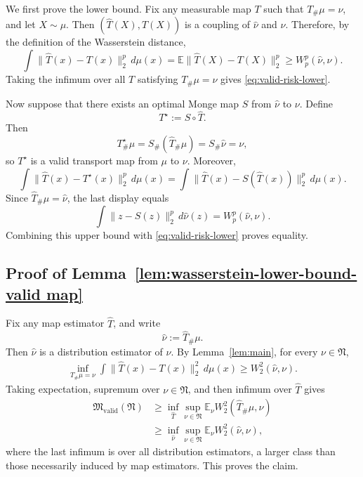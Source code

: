 \documentclass[11pt,twoside]{article}
\newcommand{\targetclass}{\mathfrak{N}}
\newcommand{\validminimaxrisk}{\mathfrak{M}_{\text{valid}}}
\begin{document}
We first prove the lower bound. Fix any measurable map $T$ such that $T_{\#}\mu=\nu$, and let $X\sim\mu$. Then
$(\widehat{T}(X),T(X))$
is a coupling of $\widehat{\nu}$ and $\nu$. Therefore, by the definition of the Wasserstein distance,
\[
\int \|\widehat{T}(x)-T(x)\|_2^p\,d\mu(x)
=
\mathbb{E}\|\widehat{T}(X)-T(X)\|_2^p
\geq
W_p^p(\widehat{\nu},\nu).
\]
Taking the infimum over all $T$ satisfying $T_{\#}\mu=\nu$ gives \eqref{eq:valid-risk-lower}.

Now suppose that there exists an optimal Monge map $S$ from $\widehat{\nu}$ to $\nu$. Define
\[
T^\star := S\circ \widehat{T}.
\]
Then
\[
T^\star_{\#}\mu
=
S_{\#}(\widehat{T}_{\#}\mu)
=
S_{\#}\widehat{\nu}
=
\nu,
\]
so $T^\star$ is a valid transport map from $\mu$ to $\nu$. Moreover,
\[
\int \|\widehat{T}(x)-T^\star(x)\|_2^p\,d\mu(x)
=
\int \|\widehat{T}(x)-S(\widehat{T}(x))\|_2^p\,d\mu(x).
\]
Since $\widehat{T}_{\#}\mu=\widehat{\nu}$, the last display equals
\[
\int \|z-S(z)\|_2^p\,d\widehat{\nu}(z)
=
W_p^p(\widehat{\nu},\nu).
\]
Combining this upper bound with \eqref{eq:valid-risk-lower} proves equality.



\subsection{Proof of Lemma~\ref{lem:wasserstein-lower-bound-valid map}}
Fix any map estimator $\widehat T$, and write
\[
\widehat\nu:=\widehat T_\#\mu.
\]
Then $\widehat\nu$ is a distribution estimator of $\nu$. By Lemma~\ref{lem:main}, for every $\nu\in\targetclass$,
\begin{align*}
\inf_{T_\#\mu=\nu}
\int \|\widehat T(x)-T(x)\|_2^2\,d\mu(x)
\geq
W_2^2(\widehat\nu,\nu).
\end{align*}
Taking expectation, supremum over $\nu\in\targetclass$, and then infimum over $\widehat T$ gives
\begin{align*}
\validminimaxrisk(\targetclass)
&\geq
\inf_{\widehat T}
\sup_{\nu\in\targetclass}
\mathbb E_\nu W_2^2(\widehat T_\#\mu,\nu) \\
&\geq
\inf_{\widehat\nu}
\sup_{\nu\in\targetclass}
\mathbb E_\nu W_2^2(\widehat\nu,\nu),
\end{align*}
where the last infimum is over all distribution estimators, a larger class than those necessarily induced by map estimators. This proves the claim.
\end{document}
